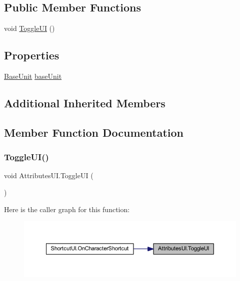 \subsection*{Public Member Functions}
\begin{DoxyCompactItemize}
\item 
void \mbox{\hyperlink{class_attributes_u_i_a7cb7b0cebe1130576d6bbd279cb62ac1}{Toggle\+UI}} ()
\end{DoxyCompactItemize}
\subsection*{Properties}
\begin{DoxyCompactItemize}
\item 
\mbox{\hyperlink{class_base_unit}{Base\+Unit}} \mbox{\hyperlink{class_attributes_u_i_a346e8b850f9b6c18b78fc7175d89bea7}{base\+Unit}}
\end{DoxyCompactItemize}
\subsection*{Additional Inherited Members}


\subsection{Member Function Documentation}
\mbox{\label{class_attributes_u_i_a7cb7b0cebe1130576d6bbd279cb62ac1}} 
\subsubsection{\texorpdfstring{ToggleUI()}{ToggleUI()}}
{\footnotesize\ttfamily void Attributes\+U\+I.\+Toggle\+UI (\begin{DoxyParamCaption}{ }\end{DoxyParamCaption})}

Here is the caller graph for this function\+:
\nopagebreak
\begin{figure}[H]
\begin{center}
\leavevmode
\includegraphics[width=350pt]{class_attributes_u_i_a7cb7b0cebe1130576d6bbd279cb62ac1_icgraph}
\end{center}
\end{figure}


